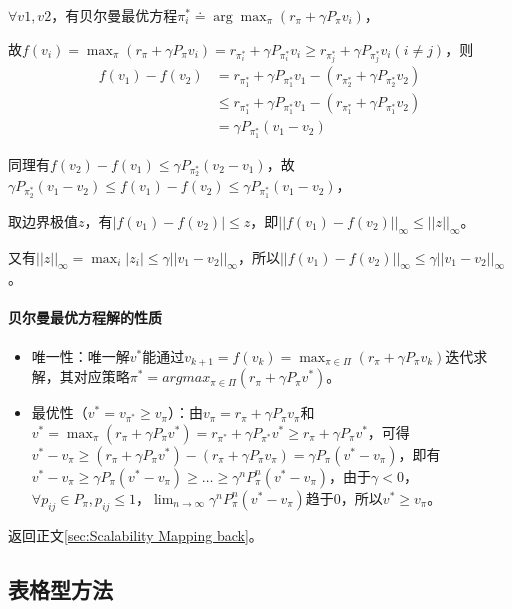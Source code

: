 \documentclass[
12pt, %
a4paper, 
oneside, %
headinclude,footinclude, %
]{scrartcl}
\begin{document}
$ \forall v1,v2 $，有贝尔曼最优方程$ \pi_i^* \doteq \arg \max_{\pi}(r_\pi + \gamma P_\pi v_i) $，

故$ f(v_i) = \max_{\pi}(r_\pi + \gamma P_\pi v_i) = r_{\pi_i^*} + \gamma P_{\pi_i^*} v_i \geq r_{\pi_j^*} + \gamma P_{\pi_j^*} v_i (i \neq j) $，则
\begin{align*}
f(v_1) - f(v_2) 
&= r_{\pi_1^*} + \gamma P_{\pi_1^*} v_1 - (r_{\pi_2^*} + \gamma P_{\pi_2^*} v_2) \\
&\leq r_{\pi_1^*} + \gamma P_{\pi_1^*} v_1 - (r_{\pi_1^*} + \gamma P_{\pi_1^*} v_2) \\
&= \gamma P_{\pi_1^*} (v_1 - v_2)
\end{align*}

同理有$ f(v_2) - f(v_1) \leq \gamma P_{\pi_2^*} (v_2 - v_1) $，故$ \gamma P_{\pi_2^*} (v_1 - v_2) \leq f(v_1) - f(v_2) \leq \gamma P_{\pi_1^*} (v_1 - v_2) $，

取边界极值$ z $，有$ |f(v_1) - f(v_2)| \leq z $，即$ ||f(v_1) - f(v_2)||_\infty \leq ||z||_\infty $。

又有$ ||z||_\infty = \max_i |z_i| \leq \gamma ||v_1 - v_2||_\infty $，所以$ ||f(v_1) - f(v_2)||_\infty \leq \gamma ||v_1 - v_2||_\infty $。
\paragraph{贝尔曼最优方程解的性质}
\begin{itemize}
\item 唯一性：唯一解$ v^* $能通过$ v_{k + 1} = f(v_k) = \max_{\pi \in \Pi} (r_\pi + \gamma P_\pi v_k) $迭代求解，其对应策略$ \pi^* = argmax_{\pi \in \Pi}(r_\pi + \gamma P_\pi v^*) $。
\item 最优性（$ v^* = v_{\pi^*} \geq v_{\pi} $）：由$ v_{\pi} = r_{\pi} + \gamma P_{\pi} v_{\pi} $和$ v^* = \max_{\pi}(r_{\pi} + \gamma P_{\pi} v^*) = r_{\pi^*} + \gamma P_{\pi^*} v^* \geq r_{\pi} + \gamma P_{\pi} v^* $，可得$ v^* - v_{\pi} \geq (r_{\pi} + \gamma P_{\pi} v^*) - (r_{\pi} + \gamma P_{\pi} v_{\pi}) = \gamma P_{\pi}(v^* - v_{\pi}) $，即有$ v^* - v_{\pi} \geq \gamma P_{\pi}(v^* - v_{\pi}) \geq \dots \geq \gamma^n P_{\pi}^n(v^* - v_{\pi}) $，由于$ \gamma < 0 $，$ \forall p_{ij} \in P_{\pi}, p_{ij} \leq 1 $，$ \lim_{n \to \infty} \gamma^n P_{\pi}^n(v^* - v_{\pi}) $趋于$ 0 $，所以$ v^* \geq v_{\pi} $。
\end{itemize}

返回正文\ref{sec:Scalability Mapping back}。
\subsection[表格型方法]{表格型方法}
\end{document}
